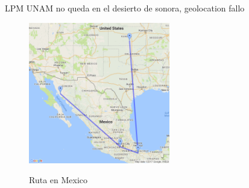 LPM UNAM no queda en el desierto de sonora, geolocation fallo
\begin{figure}[H]
\centering
\caption{Ruta en Mexico}
\includegraphics[width=0.55\textwidth]{modules/unam_path_2}
 \label{fig:ruta_unam_2}
\end{figure}
